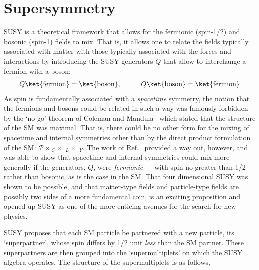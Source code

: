 \section{Supersymmetry}
\label{sec:susy}

SUSY is a theoretical framework that allows for the fermionic (spin-1/2) and bosonic (spin-1)
fields to mix.
That is, it allows one to relate the fields typically associated with matter with those
typically associated with the forces and interactions by introducing the SUSY generators $Q$ that
allow to interchange a fermion with a boson:
\begin{align}
    Q \ket{\text{fermion}} = \ket{\text{boson}}, \hspace{1cm} Q \ket{\text{boson}} = \ket{\text{fermion}}
    \label{eq:susy_operator}
\end{align}
As spin is fundamentally associated with a \textit{spacetime} symmetry, the notion 
that the fermions and bosons could be related in such a way was famously forbidden
by the `no-go' theorem of Coleman and Mandula~\cite{ColemanMandula} which stated that
the structure
of the SM was maximal.
That is, there could be no other form for the mixing of spacetime and internal
symmetries other than by the direct product formulation of the SM: $\mathcal{P} \times$\SUthree$_C \times $ \SUtwo$_L \times$ \Uone$_{Y}$.
The work of Ref.~\cite{HaagSUSY} provided a way out, however, and was able to show
that spacetime and internal symmetries could mix more generally if the generators, $Q$, were \textit{fermionic} --- with spin no greater than 1/2 --- rather than
bosonic, as is the case in the SM.
That four dimensional SUSY was shown to be possible, and that matter-type fields and particle-type fields
are possibly two sides of a more fundamental coin, is an exciting proposition and opened
up SUSY as one of the more enticing avenues for the search for new physics.

SUSY proposes that each SM particle be partnered with a new particle, its `superpartner', whose spin differs
by 1/2 unit \textit{less} than the SM partner.
These superpartners are then grouped into the `supermultiplets'
on which the SUSY algebra operates.
The structure of the supermultiplets is as follows,

